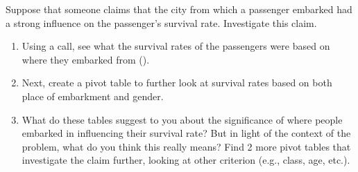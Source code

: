 \begin{problem}
Suppose that someone claims that the city from which a passenger embarked had a strong influence on the passenger's survival rate. Investigate this claim.
\begin{enumerate}
\item Using a  call, see what the survival rates of the passengers were based on where they embarked from ().
\item Next, create a pivot table to further look at survival rates based on both place of embarkment and gender.
\item What do these tables suggest to you about the significance of where people embarked in influencing their survival rate? But in light of the context of the problem, what do you think this really means? Find 2 more pivot tables that investigate the claim further, looking at other criterion (e.g., class, age, etc.).
\end{enumerate}
\end{problem}












